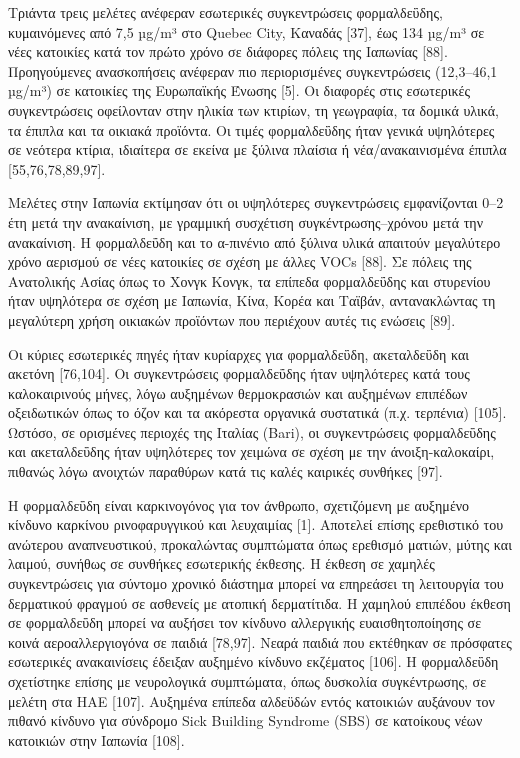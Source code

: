 Τριάντα τρεις μελέτες ανέφεραν εσωτερικές συγκεντρώσεις φορμαλδεΰδης, κυμαινόμενες από 7,5 µg/m³ στο Quebec City, Καναδάς [37], έως 134 µg/m³ σε νέες κατοικίες κατά τον πρώτο χρόνο σε διάφορες πόλεις της Ιαπωνίας [88]. Προηγούμενες ανασκοπήσεις ανέφεραν πιο περιορισμένες συγκεντρώσεις (12,3–46,1 µg/m³) σε κατοικίες της Ευρωπαϊκής Ένωσης [5]. Οι διαφορές στις εσωτερικές συγκεντρώσεις οφείλονταν στην ηλικία των κτιρίων, τη γεωγραφία, τα δομικά υλικά, τα έπιπλα και τα οικιακά προϊόντα. Οι τιμές φορμαλδεΰδης ήταν γενικά υψηλότερες σε νεότερα κτίρια, ιδιαίτερα σε εκείνα με ξύλινα πλαίσια ή νέα/ανακαινισμένα έπιπλα [55,76,78,89,97].

Μελέτες στην Ιαπωνία εκτίμησαν ότι οι υψηλότερες συγκεντρώσεις εμφανίζονται 0–2 έτη μετά την ανακαίνιση, με γραμμική συσχέτιση συγκέντρωσης–χρόνου μετά την ανακαίνιση. Η φορμαλδεΰδη και το α-πινένιο από ξύλινα υλικά απαιτούν μεγαλύτερο χρόνο αερισμού σε νέες κατοικίες σε σχέση με άλλες VOCs [88]. Σε πόλεις της Ανατολικής Ασίας όπως το Χονγκ Κονγκ, τα επίπεδα φορμαλδεΰδης και στυρενίου ήταν υψηλότερα σε σχέση με Ιαπωνία, Κίνα, Κορέα και Ταϊβάν, αντανακλώντας τη μεγαλύτερη χρήση οικιακών προϊόντων που περιέχουν αυτές τις ενώσεις [89].

Οι κύριες εσωτερικές πηγές ήταν κυρίαρχες για φορμαλδεΰδη, ακεταλδεΰδη και ακετόνη [76,104]. Οι συγκεντρώσεις φορμαλδεΰδης ήταν υψηλότερες κατά τους καλοκαιρινούς μήνες, λόγω αυξημένων θερμοκρασιών και αυξημένων επιπέδων οξειδωτικών όπως το όζον και τα ακόρεστα οργανικά συστατικά (π.χ. τερπένια) [105]. Ωστόσο, σε ορισμένες περιοχές της Ιταλίας (Bari), οι συγκεντρώσεις φορμαλδεΰδης και ακεταλδεΰδης ήταν υψηλότερες τον χειμώνα σε σχέση με την άνοιξη-καλοκαίρι, πιθανώς λόγω ανοιχτών παραθύρων κατά τις καλές καιρικές συνθήκες [97].

Η φορμαλδεΰδη είναι καρκινογόνος για τον άνθρωπο, σχετιζόμενη με αυξημένο κίνδυνο καρκίνου ρινοφαρυγγικού και λευχαιμίας [1]. Αποτελεί επίσης ερεθιστικό του ανώτερου αναπνευστικού, προκαλώντας συμπτώματα όπως ερεθισμό ματιών, μύτης και λαιμού, συνήθως σε συνθήκες εσωτερικής έκθεσης. Η έκθεση σε χαμηλές συγκεντρώσεις για σύντομο χρονικό διάστημα μπορεί να επηρεάσει τη λειτουργία του δερματικού φραγμού σε ασθενείς με ατοπική δερματίτιδα. Η χαμηλού επιπέδου έκθεση σε φορμαλδεΰδη μπορεί να αυξήσει τον κίνδυνο αλλεργικής ευαισθητοποίησης σε κοινά αεροαλλεργιογόνα σε παιδιά [78,97]. Νεαρά παιδιά που εκτέθηκαν σε πρόσφατες εσωτερικές ανακαινίσεις έδειξαν αυξημένο κίνδυνο εκζέματος [106]. Η φορμαλδεΰδη σχετίστηκε επίσης με νευρολογικά συμπτώματα, όπως δυσκολία συγκέντρωσης, σε μελέτη στα ΗΑΕ [107]. Αυξημένα επίπεδα αλδεϋδών εντός κατοικιών αυξάνουν τον πιθανό κίνδυνο για σύνδρομο Sick Building Syndrome (SBS) σε κατοίκους νέων κατοικιών στην Ιαπωνία [108].

